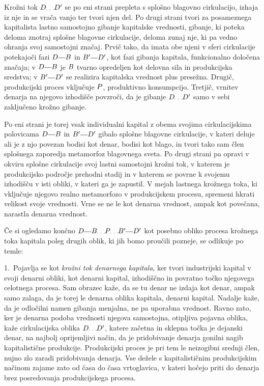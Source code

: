 \documentclass[kapital_02.tex]{subfiles}
\begin{document}
Krožni tok \(\KPED\KPEpike\KPED'\) se po eni strani prepleta s splošno blagovno cirkulacijo, izhaja iz nje in se vrača vanjo ter tvori njen del. Po drugi strani tvori za posameznega kapitalista lastno samostojno gibanje kapitalske vrednosti, gibanje, ki poteka deloma znotraj splošne blagovne cirkulacije, deloma zunaj nje, ki pa vedno ohranja svoj samostojni značaj. Prvič tako, da imata obe njeni v sferi cirkulacije potekajoči fazi \(\KPED\KPEcrta\KPEB\) in \(\KPEB'\KPEcrta\KPED'\), kot fazi gibanja kapitala, funkcionalno določena značaja; v \(\KPED\KPEcrta\KPEB\) je \(B\) tvarno opredeljen kot delovna sila in produkcijska sredstva; v \(\KPEB'\KPEcrta\KPED'\) se realizira kapitalska vrednost plus presežna. Drugič, produkcijski proces vključuje \(P\), produktivno konsumpcijo. Tretjič, vrnitev denarja na njegovo izhodišče povzroči, da je gibanje \(\KPED\KPEpike\KPED'\) samo v sebi zaključeno krožno gibanje.

Po eni strani je torej vsak individualni kapital z obema svojima cirkulacijskima polovicama \(\KPED\KPEcrta\KPEB\) in \(\KPEB'\KPEcrta\KPED'\) gibalo splošne blagovne cirkulacije, v kateri deluje ali je z njo povezan bodisi kot denar, bodisi kot blago, in tvori tako sam člen splošnega zaporedja metamorfoz blagovnega sveta. Po drugi strani pa opravi v okviru splošne cirkulacije svoj lastni samostojni krožni tok, v katerem je produkcijsko področje prehodni stadij in v katerem se povrne k svojemu izhodišču v isti obliki, v kateri ga je zapustil. V mejah lastnega krožnega toka, ki vključuje njegovo realno metamorfozo v produkcijskem procesu, spremeni hkrati velikost svoje vrednosti. Vrne se ne le kot denarna vrednost, ampak kot povečana, narastla denarna vrednost.

Če si ogledamo končno \(\KPED\KPEcrta\KPEB\KPEpike\KPEP\KPEpike\KPEB'\KPEcrta\KPED'\) kot posebno obliko procesa krožnega toka kapitala poleg drugih oblik, ki jih bomo proučili pozneje, se odlikuje po temle:

1.\ Pojavlja se kot \emph{krožni tok denarnega kapitala}, ker tvori industrijski kapital v svoji denarni obliki, kot denarni kapital, izhodiščno in povratno točko njegovega celotnega procesa. Sam obrazec kaže, da se tu denar ne izdaja kot denar, ampak samo zalaga, da je torej le denarna oblika kapitala, denarni kapital. Nadalje kaže, da je odločilni namen gibanja menjalna, ne pa uporabna vrednost. Ravno zato, ker je denarna podoba vrednosti njegova samostojna, otipljiva pojavna oblika, kaže cirkulacijska oblika \(\KPED\KPEpike\KPED'\), katere začetna in sklepna točka je dejanski denar, na najbolj oprijemljivi način, da je pridobivanje denarja gonilni nagib kapitalistične produkcije. Produkcijski proces je pri tem le neizogibni srednji člen, nujno zlo zaradi pridobivanja denarja. Vse dežele s kapitalističnim produkcijskim načinom zajame zato od časa do časa vrtoglavica, v kateri hočejo priti do denarja brez posredovanja produkcijskega procesa.
\end{document}

